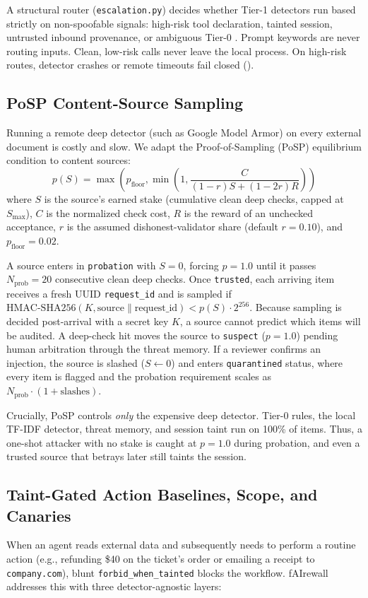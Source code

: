\documentclass[conference]{IEEEtran}
\begin{document}
A structural router (\texttt{escalation.py}) decides whether Tier-1 detectors run based strictly on non-spoofable signals: high-risk tool declaration, tainted session, untrusted inbound provenance, or ambiguous Tier-0 . Prompt keywords are never routing inputs. Clean, low-risk calls never leave the local process. On high-risk routes, detector crashes or remote timeouts fail closed ().

\subsection{PoSP Content-Source Sampling}
Running a remote deep detector (such as Google Model Armor) on every external document is costly and slow. We adapt the Proof-of-Sampling (PoSP) equilibrium condition \cite{zhang2024posp} to content sources:
\begin{equation}
    p(S) = \max\left(p_{\text{floor}}, \min\left(1, \frac{C}{(1 - r)S + (1 - 2r)R}\right)\right)
    \label{eq:posp}
\end{equation}
where $S$ is the source's earned stake (cumulative clean deep checks, capped at $S_{\max}$), $C$ is the normalized check cost, $R$ is the reward of an unchecked acceptance, $r$ is the assumed dishonest-validator share (default $r=0.10$), and $p_{\text{floor}}=0.02$.

A source enters in \texttt{probation} with $S=0$, forcing $p=1.0$ until it passes $N_{\text{prob}}=20$ consecutive clean deep checks. Once \texttt{trusted}, each arriving item receives a fresh UUID \texttt{request\_id} and is sampled if $\text{HMAC-SHA256}(K, \text{source} \parallel \text{request\_id}) < p(S) \cdot 2^{256}$. Because sampling is decided post-arrival with a secret key $K$, a source cannot predict which items will be audited. A deep-check hit moves the source to \texttt{suspect} ($p=1.0$) pending human arbitration through the threat memory. If a reviewer confirms an injection, the source is slashed ($S \leftarrow 0$) and enters \texttt{quarantined} status, where every item is flagged and the probation requirement scales as $N_{\text{prob}} \cdot (1 + \text{slashes})$.

Crucially, PoSP controls \textit{only} the expensive deep detector. Tier-0 rules, the local TF-IDF detector, threat memory, and session taint run on 100\% of items. Thus, a one-shot attacker with no stake is caught at $p=1.0$ during probation, and even a trusted source that betrays later still taints the session.

\subsection{Taint-Gated Action Baselines, Scope, and Canaries}
When an agent reads external data and subsequently needs to perform a routine action (e.g., refunding \$40 on the ticket's order or emailing a receipt to \texttt{company.com}), blunt \texttt{forbid\_when\_tainted} blocks the workflow. fAIrewall addresses this with three detector-agnostic layers:
\end{document}
